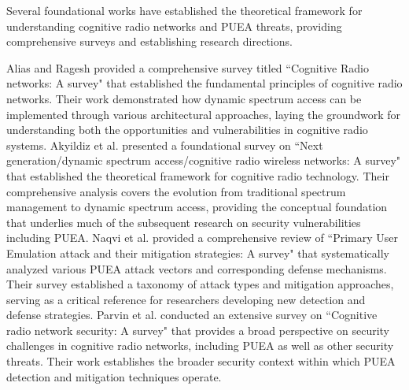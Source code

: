 Several foundational works have established the theoretical framework for understanding cognitive radio networks and PUEA threats, providing comprehensive surveys and establishing research directions.

Alias and Ragesh \cite{ref2} provided a comprehensive survey titled ``Cognitive Radio networks: A survey" that established the fundamental principles of cognitive radio networks. Their work demonstrated how dynamic spectrum access can be implemented through various architectural approaches, laying the groundwork for understanding both the opportunities and vulnerabilities in cognitive radio systems.
Akyildiz et al. \cite{ref3} presented a foundational survey on ``Next generation/dynamic spectrum access/cognitive radio wireless networks: A survey" that established the theoretical framework for cognitive radio technology. Their comprehensive analysis covers the evolution from traditional spectrum management to dynamic spectrum access, providing the conceptual foundation that underlies much of the subsequent research on security vulnerabilities including PUEA.
Naqvi et al. \cite{ref7} provided a comprehensive review of ``Primary User Emulation attack and their mitigation strategies: A survey" that systematically analyzed various PUEA attack vectors and corresponding defense mechanisms. Their survey established a taxonomy of attack types and mitigation approaches, serving as a critical reference for researchers developing new detection and defense strategies.
Parvin et al. \cite{ref25} conducted an extensive survey on ``Cognitive radio network security: A survey" that provides a broad perspective on security challenges in cognitive radio networks, including PUEA as well as other security threats. Their work establishes the broader security context within which PUEA detection and mitigation techniques operate.


